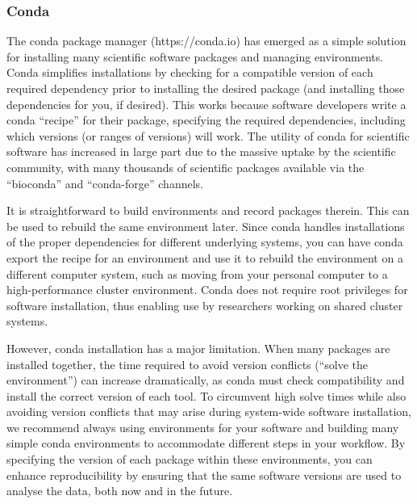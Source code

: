\documentclass[10pt,letterpaper]{article}
\begin{document}
\begin{greybox}{\subsubsection*{Conda}

The conda package manager (https://conda.io) has emerged as a simple solution for installing many scientific software packages and managing environments. Conda simplifies installations by checking for a compatible version of each required dependency prior to installing the desired package (and installing those dependencies for you, if desired). This works because software developers write a conda “recipe” for their package, specifying the required dependencies, including which versions (or ranges of versions) will work. The utility of conda for scientific software has increased in large part due to the massive uptake by the scientific community, with many thousands of scientific packages available via the “bioconda” and “conda-forge” channels. 

It is straightforward to build environments and record packages therein. This can be used to rebuild the same environment later. Since conda handles installations of the proper dependencies for different underlying systems, you can have conda export the recipe for an environment and use it to rebuild the environment on a different computer system, such as moving from your personal computer to a high-performance cluster environment. Conda does not require root privileges for software installation, thus enabling use by researchers working on shared cluster systems.

However, conda installation has a major limitation. When many packages are installed together, the time required to avoid version conflicts (“solve the environment”) can increase dramatically, as conda must check compatibility and install the correct version of each tool. To circumvent high solve times while also avoiding version conflicts that may arise during system-wide software installation, we recommend always using environments for your software and building many simple conda environments to accommodate different steps in your workflow. By specifying the version of each package within these environments, you can enhance reproducibility by ensuring that the same software versions are used to analyse the data, both now and in the future. }
\end{greybox}
\end{document}

